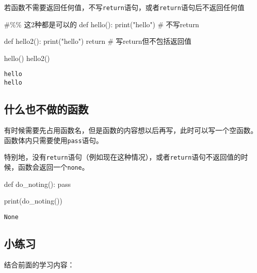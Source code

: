 \documentclass[
  letterpaper,
  DIV=11,
  numbers=noendperiod]{scrreprt}
\newenvironment{Shaded}{\begin{snugshade}}{\end{snugshade}}
\newcommand{\BuiltInTok}[1]{\textcolor[rgb]{0.00,0.23,0.31}{#1}}
\newcommand{\CommentTok}[1]{\textcolor[rgb]{0.37,0.37,0.37}{#1}}
\newcommand{\ControlFlowTok}[1]{\textcolor[rgb]{0.00,0.23,0.31}{#1}}
\newcommand{\KeywordTok}[1]{\textcolor[rgb]{0.00,0.23,0.31}{#1}}
\newcommand{\NormalTok}[1]{\textcolor[rgb]{0.00,0.23,0.31}{#1}}
\newcommand{\StringTok}[1]{\textcolor[rgb]{0.13,0.47,0.30}{#1}}
\begin{document}
若函数不需要返回任何值，不写\texttt{return}语句，或者\texttt{return}语句后不返回任何值

\begin{Shaded}
\begin{Highlighting}[]
\CommentTok{\#\%\% 这2种都是可以的}
\KeywordTok{def}\NormalTok{ hello():}
    \BuiltInTok{print}\NormalTok{(}\StringTok{"hello"}\NormalTok{) }\CommentTok{\# 不写return}
    
\KeywordTok{def}\NormalTok{ hello2():}
    \BuiltInTok{print}\NormalTok{(}\StringTok{"hello"}\NormalTok{)}
    \ControlFlowTok{return} \CommentTok{\# 写return但不包括返回值}

\NormalTok{hello()}
\NormalTok{hello2()}
\end{Highlighting}
\end{Shaded}

\begin{verbatim}
hello
hello
\end{verbatim}

\hypertarget{ux4ec0ux4e48ux4e5fux4e0dux505aux7684ux51fdux6570}{%
\subsection{什么也不做的函数}\label{ux4ec0ux4e48ux4e5fux4e0dux505aux7684ux51fdux6570}}

有时候需要先占用函数名，但是函数的内容想以后再写，此时可以写一个空函数。函数体内只需要使用\texttt{pass}语句。

特别地，没有\texttt{return}语句（例如现在这种情况），或者\texttt{return}语句不返回值的时候，函数会返回一个\texttt{none}。

\begin{Shaded}
\begin{Highlighting}[]
\KeywordTok{def}\NormalTok{ do\_noting():}
    \ControlFlowTok{pass}

\BuiltInTok{print}\NormalTok{(do\_noting())}
\end{Highlighting}
\end{Shaded}

\begin{verbatim}
None
\end{verbatim}

\hypertarget{ux5c0fux7ec3ux4e60-2}{%
\subsection{小练习}\label{ux5c0fux7ec3ux4e60-2}}

结合前面的学习内容：
\end{document}
